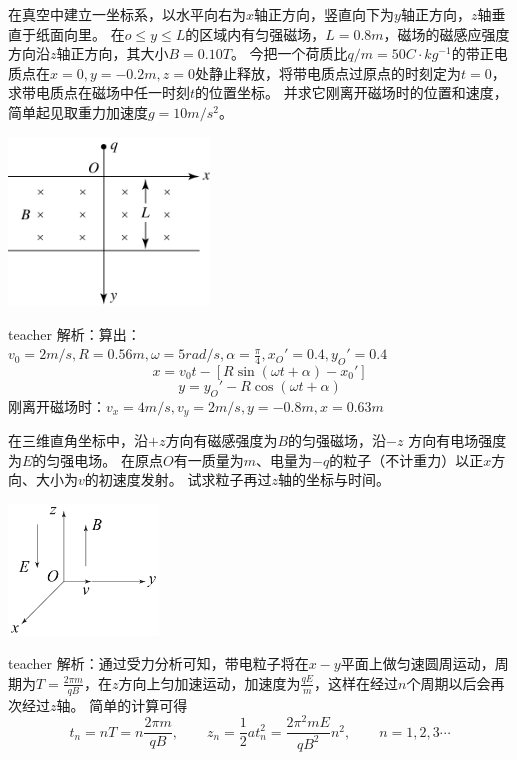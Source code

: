 \begin{example}
在真空中建立一坐标系，以水平向右为$x$轴正方向，竖直向下为$y$轴正方向，$z$轴垂直于纸面向里。
在$o\le y\le L$的区域内有匀强磁场，$L= 0.8\unit{m}$，磁场的磁感应强度方向沿$z$轴正方向，其大小$B = 0.10\unit{T}$。
今把一个荷质比$q/m = 50\unit{C\cdot kg^{-1}}$的带正电质点在$x=0,y=-0.2\unit{m},z = 0$处静止释放，将带电质点过原点的时刻定为$t=0$，求带电质点在磁场中任一时刻$t$的位置坐标。
并求它刚离开磁场时的位置和速度，简单起见取重力加速度$g = 10\unit{m/s^2}$。
\begin{flushright}
\includegraphics[width=0.4\textwidth]{images/mag-27.pdf}
\end{flushright}
\begin{taggedblock}{teacher}
\noindent
解析：算出：$v_0=2m/s,R=0.56m,\omega=5rad/s,\alpha=\frac{\pi}{4},x_O'=0.4,y_O'=0.4$\[x=v_0t-[R\sin(\omega t+\alpha)-x_0']\]
\[y=y_O'-R\cos(\omega t+\alpha)\]
刚离开磁场时：$v_x=4m/s,v_y=2m/s,y=-0.8m,x=0.63m$
\end{taggedblock}
\end{example}








\begin{example}
在三维直角坐标中，沿$+z $方向有磁感强度为$B $的匀强磁场，沿$−z$ 方向有电场强度为$E$的匀强电场。
在原点$O $有一质量为$m $、电量为$−q $的粒子（不计重力）以正$x$方向、大小为$v$的初速度发射。
试求粒子再过$z $轴的坐标与时间。
\begin{flushright}
\includegraphics[width = 0.3\textwidth]{images/mag-12.pdf} 
\end{flushright}

\begin{taggedblock}{teacher}
\noindent
解析：通过受力分析可知，带电粒子将在$x-y$平面上做匀速圆周运动，周期为$T = \frac{2\pi m}{qB}$，在$z$方向上匀加速运动，加速度为$\frac{qE}{m}$，这样在经过$n$个周期以后会再次经过$z$轴。
简单的计算可得
\[
t_n = nT = n \frac{2\pi m }{qB},\qquad z_n = \frac{1}{2}at_n^2 = \frac{2\pi^2mE}{qB^2}n^2,\qquad n=1,2,3\cdots
\]
\end{taggedblock}
\end{example}


